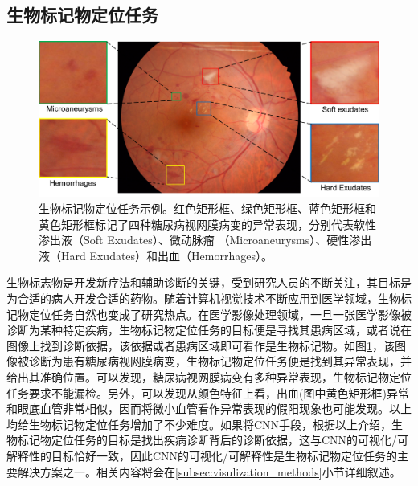 \subsection{生物标记物定位任务}\label{subsec:bio_loc_task_definition}
\begin{figure}[h]
	\centering
	\includegraphics[width=1.0\textwidth]{figure/biomarker_localization_example}
	\caption{生物标记物定位任务示例。红色矩形框、绿色矩形框、蓝色矩形框和黄色矩形框标记了四种糖尿病视网膜病变的异常表现，分别代表软性渗出液（Soft Exudates）、微动脉瘤
		（Microaneurysms）、硬性渗出液（Hard Exudates）和出血（Hemorrhages）。} 
	\label{fig:biomarker_localization_example}
\end{figure}
生物标志物是开发新疗法和辅助诊断的关键，受到研究人员的不断关注，其目标是为合适的病人开发合适的药物。随着计算机视觉技术不断应用到医学领域，生物标记物定位任务自然也变成了研究热点。在医学影像处理领域，一旦一张医学影像被诊断为某种特定疾病，生物标记物定位任务的目标便是寻找其患病区域，或者说在图像上找到诊断依据，该依据或者患病区域即可看作是生物标记物。如图\ref{fig:biomarker_localization_example}，该图像被诊断为患有糖尿病视网膜病变，生物标记物定位任务便是找到其异常表现，并给出其准确位置。可以发现，糖尿病视网膜病变有多种异常表现，生物标记物定位任务要求不能漏检。另外，可以发现从颜色特征上看，出血(图中黄色矩形框)异常和眼底血管非常相似，因而将微小血管看作异常表现的假阳现象也可能发现。以上均给生物标记物定位任务增加了不少难度。如果将CNN手段，根据以上介绍，生物标记物定位任务的目标是找出疾病诊断背后的诊断依据，这与CNN的可视化/可解释性的目标恰好一致，因此CNN的可视化/可解释性是生物标记物定位任务的主要解决方案之一。相关内容将会在\ref{subsec:visulization_methods}小节详细叙述。
